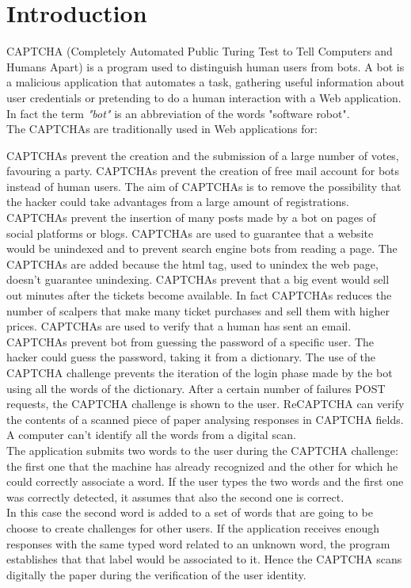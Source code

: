 \chapter{Introduction}
CAPTCHA (Completely Automated Public Turing Test to Tell Computers and Humans Apart) is a program used to distinguish human users from bots. A bot is a malicious application that automates a task, gathering useful information about user credentials or pretending to do a human interaction with a Web application. In fact the term \textit{"bot"} is an abbreviation of the words "software robot".\\
The CAPTCHAs are traditionally used in Web applications for\cite{text_audio}:
\begin{itemize}
{CAPTCHAs prevent the creation and the submission of a large number of votes, favouring a party.}
{CAPTCHAs prevent the creation of free mail account for bots instead of human users. The aim of CAPTCHAs is to remove the possibility that the hacker could take advantages from a large amount of registrations.}
{CAPTCHAs prevent the insertion of many posts made by a bot on pages of social platforms or blogs.}
{CAPTCHAs are used to guarantee that a website would be unindexed and to prevent search engine bots from reading a page. The CAPTCHAs are added because the html tag, used to unindex the web page, doesn't guarantee unindexing.}
{CAPTCHAs prevent that a big event would sell out minutes after the tickets become available. In fact CAPTCHAs reduces the number of scalpers that make many ticket purchases and sell them with higher prices.}
{CAPTCHAs are used to verify that a human has sent an email.}
{CAPTCHAs prevent bot from guessing the password of a specific user. The hacker could guess the password, taking it from a dictionary. The use of the CAPTCHA challenge prevents the iteration of the login phase made by the bot using all the words of the dictionary. After a certain number of failures POST requests, the CAPTCHA challenge is shown to the user.}
{ReCAPTCHA can verify the contents of a scanned piece of paper analysing responses in CAPTCHA fields. A computer can't identify all the words from a digital scan.\\
The application submits two words to the user during the CAPTCHA challenge: the first one that the machine has already recognized and the other for which he could correctly associate a word. If the user types the two words and the first one was correctly detected, it assumes that also the second one is correct.\\
In this case the second word is added to a set of words that are going to be choose to create challenges for other users. If the application receives enough responses with the same typed word related to an unknown word, the program establishes that that label would be associated to it. Hence the CAPTCHA scans digitally the paper during the verification of the user identity.}
\end{itemize}
